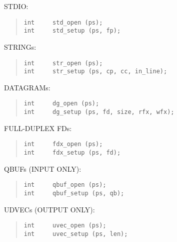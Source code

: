 \begin{bwslide}

\begin{nrtc}
\item   STDIO:
\begin{quote}\small\begin{verbatim}
int     std_open (ps);
int     std_setup (ps, fp);
\end{verbatim}\end{quote}

\item   STRINGs:
\begin{quote}\small\begin{verbatim}
int     str_open (ps);
int     str_setup (ps, cp, cc, in_line);
\end{verbatim}\end{quote}

\item   DATAGRAMs:
\begin{quote}\small\begin{verbatim}
int     dg_open (ps);
int     dg_setup (ps, fd, size, rfx, wfx);
\end{verbatim}\end{quote}

\item   FULL-DUPLEX FDs:
\begin{quote}\small\begin{verbatim}
int     fdx_open (ps);
int     fdx_setup (ps, fd);
\end{verbatim}\end{quote}

\item   QBUFs (INPUT ONLY):
\begin{quote}\small\begin{verbatim}
int     qbuf_open (ps);
int     qbuf_setup (ps, qb);
\end{verbatim}\end{quote}

\item   UDVECs (OUTPUT ONLY):
\begin{quote}\small\begin{verbatim}
int     uvec_open (ps);
int     uvec_setup (ps, len);
\end{verbatim}\end{quote}
\end{nrtc}
\end{bwslide}


